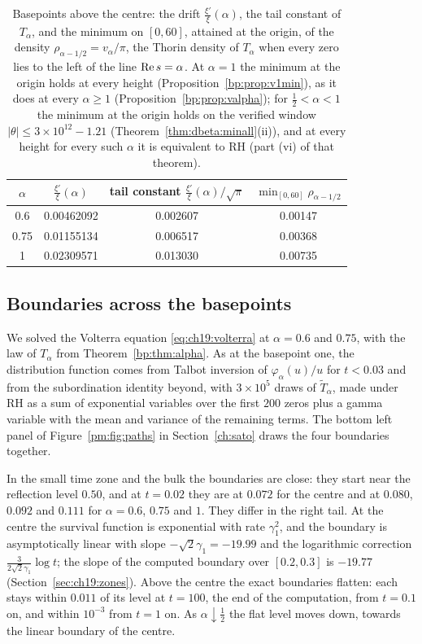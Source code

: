\begin{table}[htbp]
\centering\small
\begin{tabular}{cccc}
\toprule
$\alpha$ & $\frac{\xi'}{\xi}(\alpha)$ & tail constant $\frac{\xi'}{\xi}(\alpha)/\sqrt\pi$ & $\min_{[0,60]}\rho_{\alpha-1/2}$\\
\midrule
0.6 & 0.00462092 & 0.002607 & 0.00147\\
0.75 & 0.01155134 & 0.006517 & 0.00368\\
1 & 0.02309571 & 0.013030 & 0.00735\\
\bottomrule
\end{tabular}
\caption{Basepoints above the centre: the drift $\frac{\xi'}{\xi}(\alpha)$, the tail constant of $T_\alpha$, and the minimum on $[0,60]$, attained at the origin, of the density $\rho_{\alpha-1/2}=v_\alpha/\pi$, the Thorin density of $T_\alpha$ when every zero lies to the left of the line $\operatorname{Re} s=\alpha$. At $\alpha=1$ the minimum at the origin holds at every height (Proposition~\ref{bp:prop:v1min}), as it does at every $\alpha\ge1$ (Proposition~\ref{bp:prop:valpha}); for $\frac12<\alpha<1$ the minimum at the origin holds on the verified window $|\theta|\le3\times10^{12}-1.21$ (Theorem~\ref{thm:dbeta:minall}(ii)), and at every height for every such $\alpha$ it is equivalent to RH (part (vi) of that theorem).}
\label{bp:tab:alpha}
\end{table}

\subsection{Boundaries across the basepoints}\label{bp:sec:across}

We solved the Volterra equation \eqref{eq:ch19:volterra} \cite{Peskir02} at $\alpha=0.6$ and $0.75$, with the law of $T_\alpha$ from Theorem~\ref{bp:thm:alpha}. As at the basepoint one, the distribution function comes from Talbot inversion of $\varphi_\alpha(u)/u$ for $t<0.03$ and from the subordination identity beyond, with $3\times10^5$ draws of $\widetilde T_\alpha$, made under RH as a sum of exponential variables over the first $200$ zeros plus a gamma variable with the mean and variance of the remaining terms. The bottom left panel of Figure~\ref{pm:fig:paths} in Section~\ref{ch:sato} draws the four boundaries together.

In the small time zone and the bulk the boundaries are close: they start near the reflection level $0.50$, and at $t=0.02$ they are at $0.072$ for the centre and at $0.080$, $0.092$ and $0.111$ for $\alpha=0.6$, $0.75$ and $1$. They differ in the right tail. At the centre the survival function is exponential with rate $\gamma_1^2$, and the boundary is asymptotically linear with slope $-\sqrt2\gamma_1=-19.99$ and the logarithmic correction $\frac{3}{2\sqrt2\gamma_1}\log t$; the slope of the computed boundary over $[0.2,0.3]$ is $-19.77$ (Section~\ref{sec:ch19:zones}). Above the centre the exact boundaries flatten: each stays within $0.011$ of its level at $t=100$, the end of the computation, from $t=0.1$ on, and within $10^{-3}$ from $t=1$ on. As $\alpha\downarrow\frac12$ the flat level moves down, towards the linear boundary of the centre.

